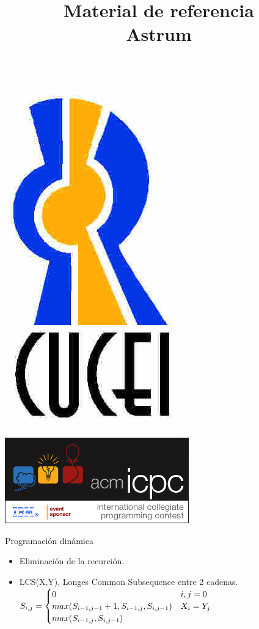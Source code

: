 \documentclass[a4paper,spanish,10pt]{article}
\title{Material de referencia\\Astrum}
\date{}
\begin{document}
	\maketitle
	\begin{center}
		\includegraphics[scale=0.25]{cucei.jpg}
		\\
		\includegraphics{acm.png} 
	\end{center}
	\setcounter{page}{0}	
	\newpage
	Programaci\'on din\'amica\\
	\begin{itemize}
		\item Eliminaci\'on de la recurci\'on. 
		\item {
			LCS(X,Y), Longes Common Subsequence entre 2 cadenas. \\
			$S_{i,j}=
			\begin{cases}
				0&i,j=0\\
				max(S_{i-1,j-1}+1,S_{i-1,j},S_{i,j-1})&X_i=Y_j\\
				max(S_{i-1,j},S_{i,j-1})
			\end{cases}\\
			$
		}			
	\end{itemize}
\end{document}
